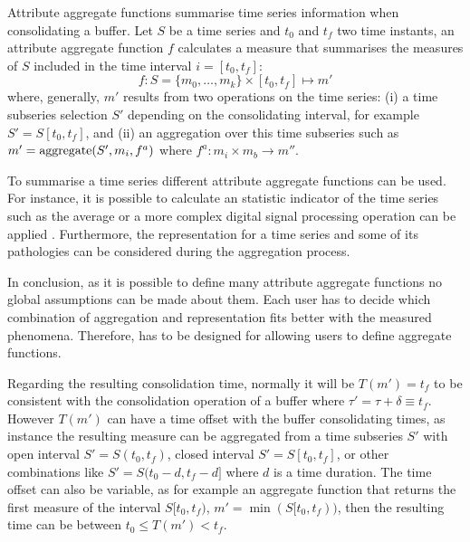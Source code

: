 Attribute aggregate functions summarise time series information
when consolidating a buffer. Let $S$ be a time
series and $t_0$ and $t_f$ two time instants, an attribute aggregate
function $f$ calculates a measure that summarises the measures of $S$
included in the time interval $i=[t_0,t_f]$:
\[
f : S=\{m_0,\ldots,m_k\} \times [t_0,t_f] \mapsto m'
\]
where, generally, $m'$ results from two operations on the time series:
(i) a time subseries selection $S'$ depending on the consolidating
interval, for example $S' = S[t_0,t_f]$, and (ii) an aggregation over
this time subseries such as $m' = \operatorname*{aggregate}(S',m_i, f^a)$ where $f^a: m_i \times
m_b \rightarrow m''$.  

To summarise a time series different attribute aggregate functions can
be used.  For instance, it is possible to calculate an statistic
indicator of the time series such as the average or a more complex
digital signal processing operation can be applied
\cite{zhang11}. Furthermore, the representation for a time series and
some of its pathologies can be considered during the aggregation
process.


In conclusion, as it is possible to define many attribute aggregate
functions no global assumptions can be made about them. Each user has
to decide which combination of aggregation and representation fits
better with the measured phenomena.  Therefore,  has to be
designed for allowing users to define aggregate functions.





Regarding the resulting consolidation time, normally it will be
$T(m')=t_f$ to be consistent with the consolidation operation of a
buffer where $\tau' = \tau + \delta \equiv t_f$. However $T(m')$ can
have a time offset with the buffer consolidating times, as instance
the resulting measure can be aggregated from a time subseries $S'$
with open interval $S'=S(t_0,t_f)$, closed interval $S'=S[t_0,t_f]$,
or other combinations like $S'=S(t_0-d,t_f-d]$ where $d$ is a time
duration.  The time offset can also be variable, as for example an
aggregate function that returns the first measure of the interval
$S[t_0,t_f)$, $m'=\min(S[t_0,t_f))$, then the resulting time can be
between $t_0 \leq T(m') < t_f$.

